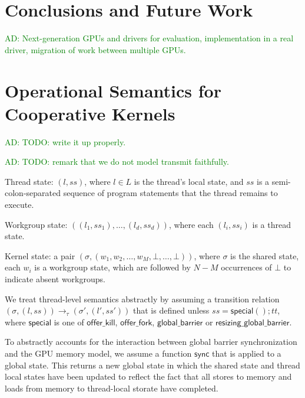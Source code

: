 \documentclass[numbers,nocopyrightspace,10pt]{sigplanconf}
\newcommand{\ADComment}[1]{\textcolor{green}{AD: #1}}
\newcommand{\offerfork}{\mathsf{offer\_fork}}
\newcommand{\offerkill}{\mathsf{offer\_kill}}
\newcommand{\globalbarrier}{\mathsf{global\_barrier}}
\newcommand{\resizingglobalbarrier}{\mathsf{resizing\_global\_barrier}}
\begin{document}
\section{Conclusions and Future Work}\label{sec:conclusion}

\ADComment{Next-generation GPUs and drivers for evaluation,
  implementation in a real driver, migration of work between multiple
  GPUs.}

\clearpage




\appendix

\section{Operational Semantics for Cooperative Kernels}\label{appendix:semantics}

\ADComment{TODO: write it up properly.}

\ADComment{TODO: remark that we do not model transmit faithfully.}

Thread state: $(l, \mathit{ss})$, where $l \in L$ is the thread's
local state, and $\mathit{ss}$ is a semi-colon-separated sequence of
program statements that the thread remains to execute.

Workgroup state: $((l_1, \mathit{ss}_1), \dots, (l_d,
\mathit{ss}_d))$, where each $(l_i, \mathit{ss}_i)$ is a thread state.

Kernel state: a pair $(\sigma, (w_1, w_2, \dots, w_M, \bot, \dots, \bot))$, where $\sigma$ is the shared state,
each $w_i$ is a workgroup state, which are
followed by $N-M$ occurrences of $\bot$ to indicate absent workgroups.

We treat thread-level semantics abstractly by assuming a transition
relation $(\sigma, (l, \mathit{ss})) \rightarrow_{\tau} (\sigma', (l',
\mathit{ss}'))$ that is defined unless $\mathit{ss} =
\mathsf{special}(); \mathit{tt}$, where $\mathsf{special}$ is one of
$\offerkill$, $\offerfork$, $\globalbarrier$ or
$\resizingglobalbarrier$.

To abstractly accounts for the interaction between global barrier
synchronization and the GPU memory model, we assume a function
$\mathsf{sync}$ that is applied to a global state.  This returns a new
global state in which the shared state and thread local states have
been updated to reflect the fact that all stores to memory and loads
from memory to thread-local storate have completed.
\end{document}
